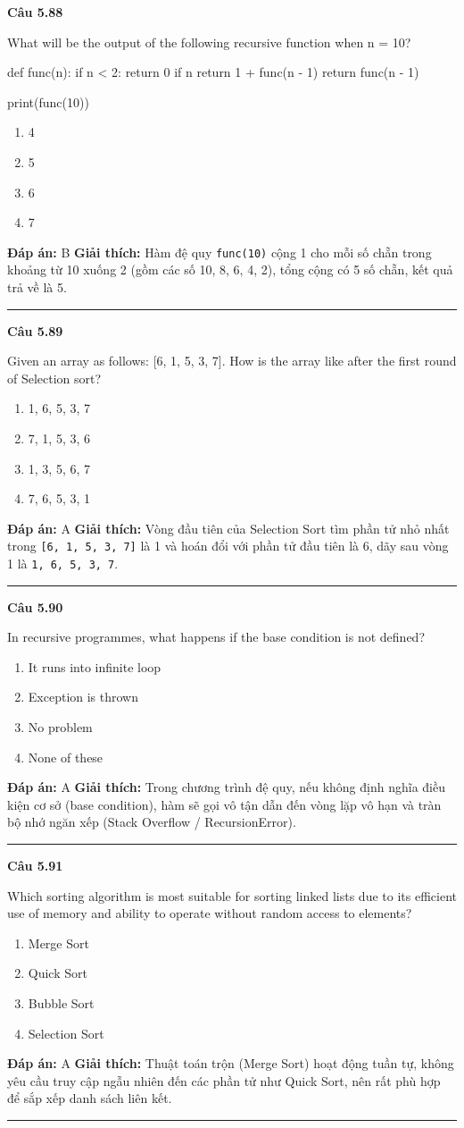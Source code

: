 \documentclass[11pt,a4paper]{article}
\newenvironment{question}[1]{%
  \par\vspace{1em}\noindent\textbf{\large Câu #1}\par\vspace{0.4em}
}{%
  \par\vspace{1em}\hrule\vspace{0.6em}
}
\newenvironment{choices}{%
  \begin{enumerate}[label=\textbf{\Alph*.},leftmargin=2.2em,itemsep=2pt,topsep=3pt]
}{%
  \end{enumerate}
}
\newcommand{\choice}{\item}
\newenvironment{codebox}{%
  \begin{tcolorbox}[colback=gray!8!white,colframe=gray!50!black,arc=1.5mm,boxrule=0.6pt,left=3mm,right=3mm,top=2.5mm,bottom=2.5mm]
  \ttfamily\small
}{%
  \end{tcolorbox}
}
\begin{document}
\begin{question}{5.88}
What will be the output of the following recursive function when n = 10?
\begin{codebox}
def func(n):
    if n < 2:
        return 0
    if n %
        return 1 + func(n - 1)
    return func(n - 1)

print(func(10))
\end{codebox}
\begin{choices}
\choice 4
\choice 5
\choice 6
\choice 7
\end{choices}
\textbf{Đáp án:} B
\textbf{Giải thích:} Hàm đệ quy \texttt{func(10)} cộng 1 cho mỗi số chẵn trong khoảng từ 10 xuống 2 (gồm các số 10, 8, 6, 4, 2), tổng cộng có 5 số chẵn, kết quả trả về là 5.
\end{question}

\begin{question}{5.89}
Given an array as follows: [6, 1, 5, 3, 7]. How is the array like after the first round of Selection sort?
\begin{choices}
\choice 1, 6, 5, 3, 7
\choice 7, 1, 5, 3, 6
\choice 1, 3, 5, 6, 7
\choice 7, 6, 5, 3, 1
\end{choices}
\textbf{Đáp án:} A
\textbf{Giải thích:} Vòng đầu tiên của Selection Sort tìm phần tử nhỏ nhất trong \texttt{[6, 1, 5, 3, 7]} là 1 và hoán đổi với phần tử đầu tiên là 6, dãy sau vòng 1 là \texttt{1, 6, 5, 3, 7}.
\end{question}

\begin{question}{5.90}
In recursive programmes, what happens if the base condition is not defined?
\begin{choices}
\choice It runs into infinite loop
\choice Exception is thrown
\choice No problem
\choice None of these
\end{choices}
\textbf{Đáp án:} A
\textbf{Giải thích:} Trong chương trình đệ quy, nếu không định nghĩa điều kiện cơ sở (base condition), hàm sẽ gọi vô tận dẫn đến vòng lặp vô hạn và tràn bộ nhớ ngăn xếp (Stack Overflow / RecursionError).
\end{question}

\begin{question}{5.91}
Which sorting algorithm is most suitable for sorting linked lists due to its efficient use of memory and ability to operate without random access to elements?
\begin{choices}
\choice Merge Sort
\choice Quick Sort
\choice Bubble Sort
\choice Selection Sort
\end{choices}
\textbf{Đáp án:} A
\textbf{Giải thích:} Thuật toán trộn (Merge Sort) hoạt động tuần tự, không yêu cầu truy cập ngẫu nhiên đến các phần tử như Quick Sort, nên rất phù hợp để sắp xếp danh sách liên kết.
\end{question}
\end{document}
